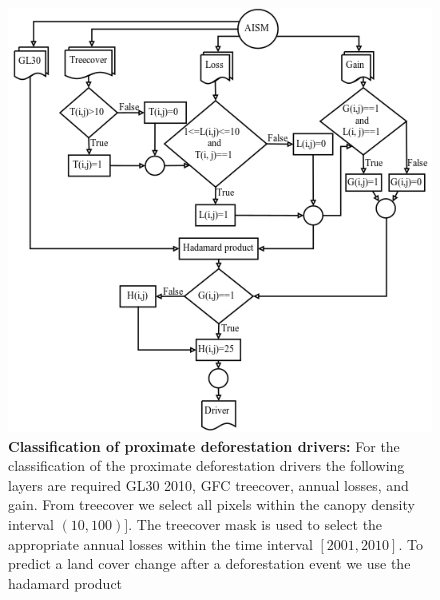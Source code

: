 			\begin{figure}[ht]
				\centering
				\includegraphics[scale=.68]{img/driver_flowchart}
				\caption[Classification of proximate deforestation drivers]{\textbf{Classification of proximate deforestation drivers:} For the classification of the proximate deforestation drivers the following layers are required GL30 2010, GFC treecover, annual losses, and gain. From treecover we select all pixels within the canopy density interval $(10,100)]$. The treecover mask is used to select the appropriate annual losses within the time interval $[2001,2010]$. To predict a land cover change after a deforestation event we use the hadamard product }
				\label{fig:driver_flowchart}
			\end{figure}

